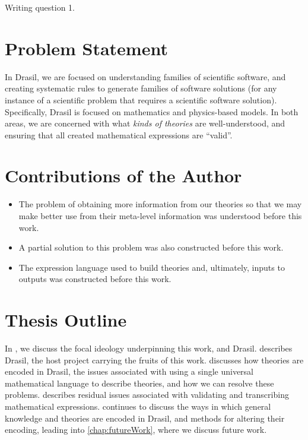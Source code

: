 \begin{writingquestions}
      \item Writing question 1.
\end{writingquestions}


\section{Problem Statement}

In Drasil, we are focused on understanding families of scientific software, and
creating systematic rules to generate families of software solutions (for any
instance of a scientific problem that requires a scientific software solution).
Specifically, Drasil is focused on mathematics and physics-based models. In both
areas, we are concerned with what \textit{kinds of theories} are
well-understood, and ensuring that all created mathematical expressions are
``valid''.


\section{Contributions of the Author}

\begin{itemize}
      \item The problem of obtaining more information from our theories so that we
            may make better use from their meta-level information was understood
            before this work.
      \item A partial solution to this problem was also constructed before this
            work.
      \item The expression language used to build theories and, ultimately, inputs
            to outputs was constructed before this work.
\end{itemize}

\section{Thesis Outline}

In , we discuss the focal ideology underpinning this work,
and Drasil.  describes Drasil, the host project carrying the
fruits of this work.  discusses how theories are encoded
in Drasil, the issues associated with using a single universal mathematical
language to describe theories, and how we can resolve these problems.
 describes residual issues associated with validating and
transcribing mathematical expressions.  continues to
discuss the ways in which general knowledge and theories are encoded in Drasil,
and methods for altering their encoding, leading into \cref{chap:futureWork},
where we discuss future work.
